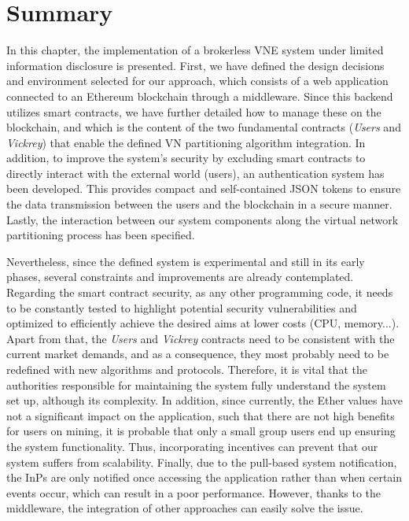 \section{Summary}

In this chapter, the implementation of a brokerless VNE system under limited information disclosure is presented. First, we have defined the design decisions and environment selected for our approach, which consists of a web application connected to an Ethereum blockchain through a middleware. Since this backend utilizes smart contracts, we have further detailed how to manage these on the blockchain, and which is the content of the two fundamental contracts (\textit{Users} and \textit{Vickrey}) that enable the defined VN partitioning algorithm integration. In addition, to improve the system's security by excluding smart contracts to directly interact with the external world (users), an authentication system has been developed. This provides compact and self-contained JSON tokens to ensure the data transmission between the users and the blockchain in a secure manner. Lastly, the interaction between our system components along the virtual network partitioning process has been specified.

Nevertheless, since the defined system is experimental and still in its early phases, several constraints and improvements are already contemplated. Regarding the smart contract security, as any other programming code, it needs to be constantly tested to highlight potential security vulnerabilities and optimized to efficiently achieve the desired aims at lower costs (CPU, memory...). Apart from that, the \textit{Users} and \textit{Vickrey} contracts need to be consistent with the current market demands, and as a consequence, they most probably need to be redefined with new algorithms and protocols. Therefore, it is vital that the authorities responsible for maintaining the system fully understand the system set up, although its complexity. In addition, since currently, the Ether values have not a significant impact on the application, such that there are not high benefits for users on mining, it is probable that only a small group users end up ensuring the system functionality. Thus, incorporating incentives can prevent that our system suffers from scalability. Finally, due to the pull-based system notification, the InPs are only notified once accessing the application rather than when certain events occur, which can result in a poor performance. However, thanks to the middleware, the integration of other approaches can easily solve the issue.

